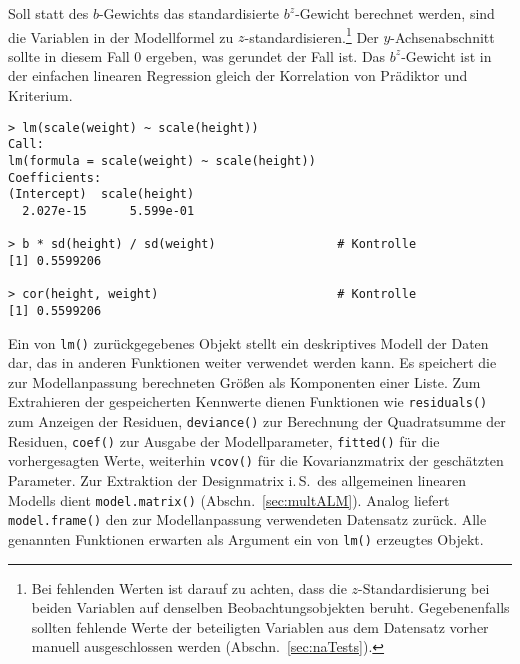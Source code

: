 Soll statt des $b$-Gewichts das standardisierte $b^{z}$-Gewicht berechnet werden, sind die Variablen in der Modellformel zu $z$-standardisieren.\footnote{\label{ftn:scaleNA}Bei fehlenden Werten ist darauf zu achten, dass die $z$-Standardisierung bei beiden Variablen auf denselben Beobachtungsobjekten beruht. Gegebenenfalls sollten fehlende Werte der beteiligten Variablen aus dem Datensatz vorher manuell ausgeschlossen werden (Abschn.\ \ref{sec:naTests}).} Der $y$-Achsenabschnitt sollte in diesem Fall $0$ ergeben, was gerundet der Fall ist. Das $b^{z}$-Gewicht ist in der einfachen linearen Regression gleich der Korrelation von Prädiktor und Kriterium.
\begin{lstlisting}
> lm(scale(weight) ~ scale(height))
Call:
lm(formula = scale(weight) ~ scale(height))
Coefficients:
(Intercept)  scale(height)
  2.027e-15      5.599e-01

> b * sd(height) / sd(weight)                 # Kontrolle
[1] 0.5599206

> cor(height, weight)                         # Kontrolle
[1] 0.5599206
\end{lstlisting}

Ein von \lstinline!lm()! zurückgegebenes Objekt stellt ein deskriptives Modell der Daten dar, das in anderen Funktionen weiter verwendet werden kann. Es speichert die zur Modellanpassung berechneten Größen als Komponenten einer Liste. Zum Extrahieren der gespeicherten Kennwerte dienen Funktionen wie \lstinline!residuals()! zum Anzeigen der Residuen, 
\lstinline!deviance()! zur Berechnung der Quadratsumme der Residuen, \lstinline!coef()! zur Ausgabe der Modellparameter, \lstinline!fitted()! für die vorhergesagten Werte, weiterhin \lstinline!vcov()! für die Kovarianzmatrix der geschätzten Parameter. Zur Extraktion der Designmatrix i.\,S.\ des allgemeinen linearen Modells dient \lstinline!model.matrix()! (Abschn.\ \ref{sec:multALM}). Analog liefert  \lstinline!model.frame()! den zur Modellanpassung verwendeten Datensatz zurück. Alle genannten Funktionen erwarten als Argument ein von \lstinline!lm()! erzeugtes Objekt.

